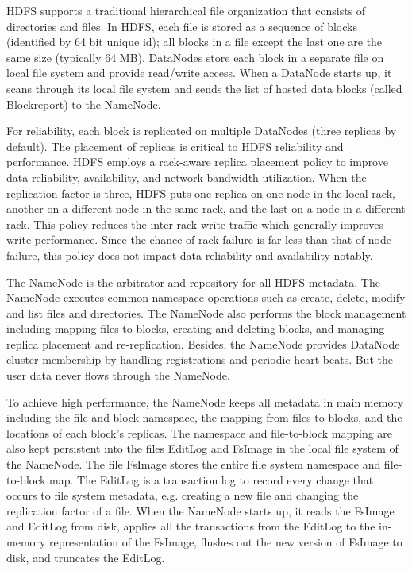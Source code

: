\documentclass[11pt]{book}
\begin{document}
HDFS supports a traditional hierarchical file organization that consists of directories and files. In HDFS, each file is stored as a sequence of blocks (identified by 64 bit unique id); all blocks in a file except the last one are the same size (typically 64 MB). DataNodes store each block in a separate file  on local file system and provide read/write access. When a DataNode starts up, it scans through its local file system and sends the list of hosted data blocks (called Blockreport) to the NameNode.

For reliability, each block is replicated on multiple DataNodes (three replicas by default). The placement of replicas is critical to HDFS reliability and performance.  HDFS employs a rack-aware replica placement policy to improve data reliability, availability, and network bandwidth utilization. 
When the replication factor is three, HDFS puts one replica on one node in the local rack, another on a different node in the same rack, and the last on a node in a different rack. This policy reduces the inter-rack write traffic which generally improves write performance. Since the chance of rack failure is far less than that of node failure, this policy does not impact data reliability and availability notably.

The NameNode is the arbitrator and repository for all HDFS metadata. The NameNode executes common namespace operations such as create, delete, modify and list files and directories. The NameNode also performs the block management including mapping files to blocks, creating and deleting blocks, and managing replica placement and re-replication. Besides, the NameNode provides DataNode cluster membership by handling registrations and periodic heart beats. But the user data never flows through the NameNode. 

To achieve high performance, the NameNode keeps all metadata in main memory including the file and block namespace, the mapping from files to blocks, and the locations of each block's replicas. The namespace and file-to-block mapping are also kept persistent into the files EditLog and FsImage in the local file system of the NameNode. The file FsImage stores the entire file system namespace and file-to-block map. The EditLog is a transaction log to record every change that occurs to file system metadata, e.g. creating a new file and changing the replication factor of a file.
When the NameNode starts up, it reads the FsImage and EditLog from disk, applies all the transactions from the EditLog to the in-memory representation of the FsImage, flushes out the new version of FsImage to disk, and truncates the EditLog.
 
\end{document}
